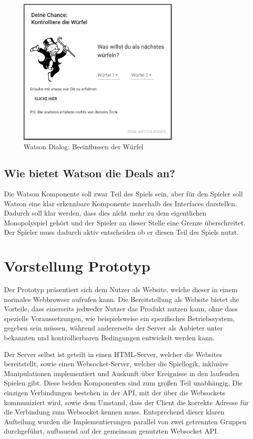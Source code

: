 \documentclass[german]{cgspaper} %
\begin{document}
\begin{figure}[h]\\
\caption{Watson Dialog: Beeinflussen der Würfel}
\includegraphics[width=8cm]{watson_dices}
\end{figure}


\subsection{Wie bietet Watson die Deals an?}

Die Watson Komponente soll zwar Teil des Spiels sein, aber für den Spieler soll Watson eine klar erkennbare Komponente innerhalb des Interfaces darstellen.
Dadurch soll klar werden, dass dies nicht mehr zu dem eigentlichen Monopolyspiel gehört und der Spieler an dieser Stelle eine Grenze überschreitet.
Der Spieler muss dadurch aktiv entscheiden ob er diesen Teil des Spiels nutzt.

\section{Vorstellung Prototyp}\label{sec:prototype}

Der Prototyp präsentiert sich dem Nutzer als Website, welche dieser in einem normales Webbrowser aufrufen kann.
Die Bereitstellung als Website bietet die Vorteile, dass einerseits jedweder Nutzer das Produkt nutzen kann, ohne dass spezielle Voraussetzungen, wie beispielsweise ein spezifisches Betriebssystem, gegeben sein müssen, während andererseits der Server als Anbieter unter bekannten und kontrollierbaren Bedingungen entwickelt werden kann.

Der Server selbst ist geteilt in einen HTML-Server, welcher die Websites bereitstellt, sowie einen Websocket-Server, welcher die Spiellogik, inklusive Manipulationen implementiert und Auskunft über Ereignisse in den laufenden Spielen gibt.
Diese beiden Komponenten sind zum großen Teil unabhängig. Die einzigen Verbindungen bestehen in der API, mit der über die Websockets kommuniziert wird, sowie dem Umstand, dass der Client die korrekte Adresse für die Verbindung zum Websocket kennen muss.
Entsprechend dieser klaren Aufteilung wurden die Implementierungen parallel von zwei getrennten Gruppen durchgeführt, aufbauend auf der gemeinsam genutzten Websocket API.
\end{document}
